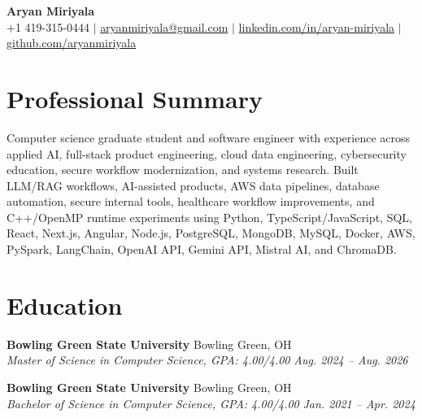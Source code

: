 \documentclass[letterpaper,10pt]{article}
\newcommand{\resumeSubheading}[4]{
  \vspace{2pt}
  \textbf{#1} \hfill #2\\
  \textit{#3} \hfill \textit{#4}
}
\begin{document}
\begin{center}
  {\LARGE \textbf{Aryan Miriyala}}\\
  \vspace{2pt}
  +1 419-315-0444 $|$
  \href{mailto:aryanmiriyala@gmail.com}{aryanmiriyala@gmail.com} $|$
  \href{https://www.linkedin.com/in/aryan-miriyala-7788a21b6/}{linkedin.com/in/aryan-miriyala} $|$
  \href{https://github.com/aryanmiriyala}{github.com/aryanmiriyala}
\end{center}

\section{Professional Summary}
Computer science graduate student and software engineer with experience across applied AI, full-stack product engineering, cloud data engineering, cybersecurity education, secure workflow modernization, and systems research. Built LLM/RAG workflows, AI-assisted products, AWS data pipelines, database automation, secure internal tools, healthcare workflow improvements, and C++/OpenMP runtime experiments using Python, TypeScript/JavaScript, SQL, React, Next.js, Angular, Node.js, PostgreSQL, MongoDB, MySQL, Docker, AWS, PySpark, LangChain, OpenAI API, Gemini API, Mistral AI, and ChromaDB.

\section{Education}
\resumeSubheading
{Bowling Green State University}{Bowling Green, OH}
{Master of Science in Computer Science, GPA: 4.00/4.00}{Aug. 2024 -- Aug. 2026}

\resumeSubheading
{Bowling Green State University}{Bowling Green, OH}
{Bachelor of Science in Computer Science, GPA: 4.00/4.00}{Jan. 2021 -- Apr. 2024}
\end{document}
